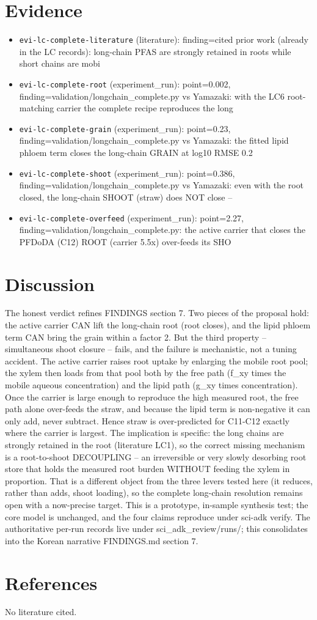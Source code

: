 \documentclass{article}
\begin{document}
\section{Evidence}
\begin{itemize}
  \item \texttt{evi-lc-complete-literature} (literature): finding=cited prior work (already in the LC records): long-chain PFAS are strongly retained in roots while short chains are mobi
  \item \texttt{evi-lc-complete-root} (experiment\_run): point=0.002, finding=validation/longchain\_complete.py vs Yamazaki: with the LC6 root-matching carrier the complete recipe reproduces the long
  \item \texttt{evi-lc-complete-grain} (experiment\_run): point=0.23, finding=validation/longchain\_complete.py vs Yamazaki: the fitted lipid phloem term closes the long-chain GRAIN at log10 RMSE 0.2
  \item \texttt{evi-lc-complete-shoot} (experiment\_run): point=0.386, finding=validation/longchain\_complete.py vs Yamazaki: even with the root closed, the long-chain SHOOT (straw) does NOT close -- 
  \item \texttt{evi-lc-complete-overfeed} (experiment\_run): point=2.27, finding=validation/longchain\_complete.py: the active carrier that closes the PFDoDA (C12) ROOT (carrier 5.5x) over-feeds its SHO
\end{itemize}

\section{Discussion}
The honest verdict refines FINDINGS section 7. Two pieces of the proposal hold: the active carrier CAN lift the long-chain root (root closes), and the lipid phloem term CAN bring the grain within a factor 2. But the third property -- simultaneous shoot closure -- fails, and the failure is mechanistic, not a tuning accident. The active carrier raises root uptake by enlarging the mobile root pool; the xylem then loads from that pool both by the free path (f\_xy times the mobile aqueous concentration) and the lipid path (g\_xy times concentration). Once the carrier is large enough to reproduce the high measured root, the free path alone over-feeds the straw, and because the lipid term is non-negative it can only add, never subtract. Hence straw is over-predicted for C11-C12 exactly where the carrier is largest. The implication is specific: the long chains are strongly retained in the root (literature LC1), so the correct missing mechanism is a root-to-shoot DECOUPLING -- an irreversible or very slowly desorbing root store that holds the measured root burden WITHOUT feeding the xylem in proportion. That is a different object from the three levers tested here (it reduces, rather than adds, shoot loading), so the complete long-chain resolution remains open with a now-precise target. This is a prototype, in-sample synthesis test; the core model is unchanged, and the four claims reproduce under sci-adk verify. The authoritative per-run records live under sci\_adk\_review/runs/; this consolidates into the Korean narrative FINDINGS.md section 7.

\section{References}
No literature cited.
\end{document}
